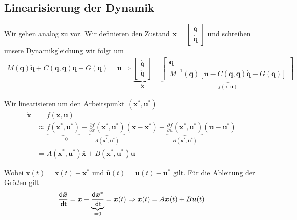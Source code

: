 \documentclass[a4paper, 12pt]{scrartcl}
\newcommand{\dt}{\thinspace \mathsf{dt}}
\begin{document}
\newpage


\subsection{Linearisierung der Dynamik}

Wir gehen analog zu \cite{ICIIECS2017} vor.
Wir definieren den Zustand 
$\textbf{x} = 
\begin{bmatrix}
    \textbf{q} \\ \dot{\textbf{q}}
\end{bmatrix}$
und schreiben unsere Dynamikgleichung wir folgt um 
\begin{align*}
    M(\textbf{q}) \ddot{\textbf{q}} 
    + C(\textbf{q}, \dot{\textbf{q}}) \dot{\textbf{q}} 
    + G(\textbf{q}) = \bm{u} 
    \Rightarrow
    \underbrace{
            \begin{bmatrix}
                \dot{\textbf{q}} \\ \ddot{\textbf{q}}
            \end{bmatrix}
    }_{
        \dot{\textbf{x}}
    }
    =
    \underbrace{
        \begin{bmatrix}
            \dot{\textbf{q}} \\
            M^{-1}(\textbf{q}) 
            \left[ 
                \bm{u} - C(\textbf{q}, \dot{\textbf{q}}) \dot{\textbf{q}} - G(\textbf{q}) 
                \right]
        \end{bmatrix}
    }_{
        f(\textbf{x}, \bm{u})
    }
\end{align*}

Wir linearisieren um den Arbeitspunkt $(\bm{x}^*, \bm{u}^*)$
\begin{align*}
    \dot{\bm{x}} 
    &= f(\bm{x},\bm{u}) \\
    &\approx \underbrace{f(\bm{x}^*,\bm{u}^*)}_{= 0} + 
    \underbrace{\frac{\partial f}{\partial x}(\bm{x}^*,\bm{u}^*)}_{A(\bm{x}^*,\bm{u}^*)}(\bm{x}-\bm{x}^*) 
    + \underbrace{\frac{\partial f}{\partial u}(\bm{x}^*,\bm{u}^*)}_{B(\bm{x}^*,\bm{u}^*)}(\bm{u}-\bm{u}^*) 
    \\
    &= A(\bm{x}^*,\bm{u}^*) \bar{\bm{x}} + B(\bm{x}^*,\bm{u}^*) \bar{\bm{u}}
\end{align*}

Wobei $\bar{\bm{x}}(t) = \bm{x}(t) -\bm{x}^*$ und $\bar{\bm{u}}(t) = \bm{u}(t)-\bm{u}^*$ gilt. 
Für die Ableitung der Größen gilt
\begin{align*}
    \frac{\mathsf{d} \bar{\bm{x}}}{\dt}
    = \dot{\bm{x}} - \underbrace{\frac{\mathsf{d} \bm{x}^*}{\dt}}_{= 0} 
    = \dot{\bm{x}}(t) 
    \Rightarrow 
    \bar{\bm{x}}(t) = A \bar{\bm{x}}(t) + B \bar{\bm{u}}(t)
\end{align*}
\end{document}
